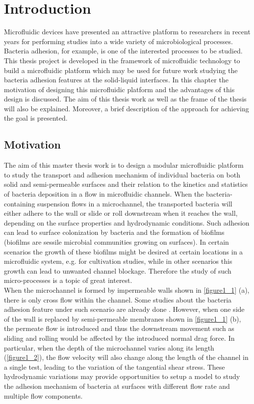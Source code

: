 \chapter{Introduction}
\label{1}
Microfluidic devices have presented an attractive platform to researchers in recent years for performing studies into a wide variety of microbiological processes. Bacteria adhesion, for example, is one of the interested processes to be studied. This thesis project is developed in the framework of microfluidic technology to build a microfluidic platform which may be used for future work studying the bacteria adhesion features at the solid-liquid interfaces. In this chapter the motivation of designing this microfluidic platform and the advantages of this design is discussed. The aim of this thesis work as well as the frame of the thesis will also be explained. Moreover, a brief description of the approach for achieving the goal is presented.

\section{Motivation}
\label{1_1}
The aim of this master thesis work is to design a modular microfluidic platform to study the transport and adhesion mechanism of individual bacteria on both solid and semi-permeable surfaces and their relation to the kinetics and statistics of bacteria deposition in a flow in microfluidic channels. When the bacteria-containing suspension flows in a microchannel, the transported bacteria will either adhere to the wall or slide or roll downstream when it reaches the wall, depending on the surface properties and hydrodynamic conditions. Such adhesion can lead to surface colonization by bacteria and the formation of biofilms (biofilms are sessile microbial communities growing on surfaces). In certain scenarios the growth of these biofilms might be desired at certain locations in a microfluidic system, e.g. for cultivation studies, while in other scenarios this growth can lead to unwanted channel blockage. Therefore the study of such micro-processes is a topic of great interest.\\

When the microchannel is formed by impermeable walls shown in  \autoref{figure1_1} (a), there is only cross flow within the channel. Some studies about the bacteria adhesion feature under such scenario are already done \cite{elimelech2013particle} \cite{levich1962physicochemical}. However, when one side of the wall is replaced by semi-permeable membranes shown in \autoref{figure1_1} (b), the permeate flow is introduced and thus the downstream movement such as sliding and rolling would be affected by the introduced normal drag force. In particular, when the depth of the microchannel varies along its length (\autoref{figure1_2}), the flow velocity will also change along the length of the channel in a single test, leading to the variation of the tangential shear stress. These hydrodynamic variations may provide opportunities to setup a model to study the adhesion mechanism of bacteria at surfaces with different flow rate and multiple flow components.


